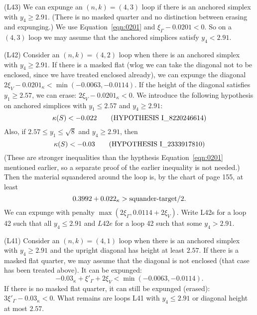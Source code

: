 \documentclass[11pt]{amsart}
\def\op#1{{\text{#1}}}
\def\text{\hbox}
\begin{document}
(L43) We can expunge an $(n,k)=(4,3)$ loop if there is an anchored simplex with $y_4\ge 2.91$.  (There is no masked quarter and no distinction between erasing and expunging.)  We use Equation~\ref{eqn:0201} and $\xi_\Gamma - 0.0201 < 0$.  So on a $(4,3)$ loop we may assume that the anchored simplices satisfy $y_4 < 2.91$.

(L42) Consider an $(n,k)=(4,2)$ loop when there is an anchored simplex with $y_4\ge 2.91$.  
If there is a masked flat (wlog we can take the diagonal not to be enclosed, since we have treated enclosed already),  we can expunge the diagonal $2\xi_V - 0.0201_\kappa < \min(-0.0063,-0.0114)$.  If the height of the diagonal satisfies $y_1\ge 2.57$, we can erase: $2\xi_V - 0.0201_\kappa < 0$.  We introduce the following
hypothesis on anchored simplices with $y_1 \le 2.57$ and $y_4 \ge 2.91$:
  \begin{equation}
  \kappa(S) < - 0.022\qquad\text{(HYPOTHESIS I\_8220246614)}
  \end{equation}
Also, if $2.57\le y_1\le\sqrt8$ and $y_4\ge 2.91$, then
  \begin{equation}
  \kappa(S) < - 0.03\qquad\text{(HYPOTHESIS I\_2333917810)}
  \end{equation}
(These are stronger inequalities than the hypthesis Equation~\ref{eqn:0201} mentioned earlier, so a separate proof of the earlier inequality is not needed.)
Then the material squandered around the loop is, by the chart of page 155, at least 
  $$
  0.3992 + 0.022_\kappa > \op{squander-target}/2.
  $$
We can expunge with penalty $\max(2\xi_\Gamma,0.0114+2\xi_V)$.
Write L42s for a loop 42 such that all $y_4\le 2.91$ and $L42e$ for a loop
42 such that some $y_4>2.91$.

  
(L41) Consider an $(n,k)=(4,1)$ loop when there is an anchored simplex with $y_4\ge 2.91$ and the upright diagonal has height at least $2.57$.  If there is a masked
flat quarter, we may assume that the diagonal is not enclosed (that case
has been treated above).  It can be expunged: $$-0.03_\kappa + \xi'_\Gamma + 2\xi_V < \min(-0.0063,-0.0114).$$  If there is no masked flat quarter, it can
still be expunged (erased):  $3\xi'_\Gamma - 0.03_\kappa < 0$.  What remains are loops L41 with $y_4\le 2.91$ or diagonal height at most $2.57$.
\end{document}
